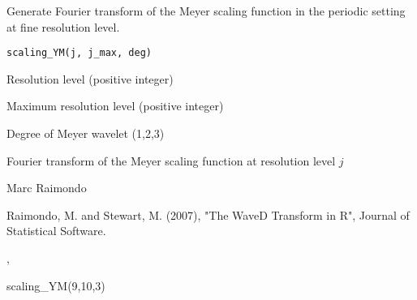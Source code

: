 \documentclass{article}
\begin{document}
\begin{Description}\relax
Generate Fourier transform  of the Meyer scaling function in the periodic setting
at fine resolution level.
\end{Description}
\begin{Usage}
\begin{verbatim}
scaling_YM(j, j_max, deg)
\end{verbatim}
\end{Usage}
\begin{Arguments}
\begin{ldescription}
\item[\code{j}] Resolution level (positive integer) 
\item[\code{j\_max}] Maximum resolution level (positive integer)
\item[\code{deg}] Degree of Meyer wavelet (1,2,3) 
\end{ldescription}
\end{Arguments}
\begin{Value}
Fourier transform  of the Meyer scaling function at resolution level $j$
\end{Value}
\begin{Author}\relax
Marc Raimondo
\end{Author}
\begin{References}\relax
Raimondo, M. and Stewart, M. (2007),
"The WaveD Transform in R", Journal of Statistical Software.
\end{References}
\begin{SeeAlso}\relax
{},
\end{SeeAlso}
\begin{Examples}
\begin{ExampleCode}
scaling_YM(9,10,3)
\end{ExampleCode}
\end{Examples}
\end{document}
